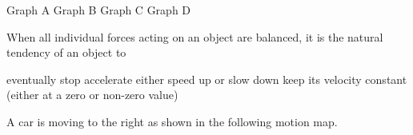 \documentclass[answers]{exam}
\begin{document}
\begin{questions}
\begin{randomizeoneparchoices}[norandomize]
    \choice Graph A
    \choice Graph B
    \correctchoice Graph C
    \choice Graph D
\end{randomizeoneparchoices}





\question 
When all individual forces acting on an object are balanced, it is the natural tendency of an object to 

\begin{randomizechoices}[norandomize]
    \choice eventually stop
    \choice accelerate
    \choice either speed up or slow down
    \correctchoice keep its velocity constant (either at a zero or non-zero value)
\end{randomizechoices}

\question 
A car is moving to the right as shown in the following motion map. 

\begin{center}
\end{center}


\end{questions}
\end{document}
